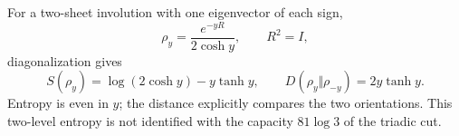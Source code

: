 For a two-sheet involution with one eigenvector of each sign,
\[
\rho_y=\frac{e^{-yR}}{2\cosh y},\qquad R^2=I,
\]
diagonalization gives
\[
S(\rho_y)=\log(2\cosh y)-y\tanh y,\qquad
D(\rho_y\Vert\rho_{-y})=2y\tanh y.
\]
Entropy is even in $y$; the distance explicitly compares
the two orientations. This two-level entropy is not identified
with the capacity $81\log3$ of the triadic cut.
